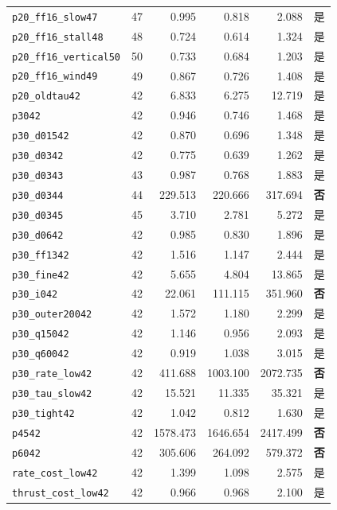 \documentclass[UTF8,a4paper,11pt,fontset=fandol]{ctexart}
\newcommand{\code}[1]{{\small\nolinkurl{#1}}}
\begin{document}
{\begin{longtable}{L{5.0cm}rrrrL{1.0cm}}
\code{p20_ff16_slow47} & 47 & 0.995 & 0.818 & 2.088 & 是\\
\code{p20_ff16_stall48} & 48 & 0.724 & 0.614 & 1.324 & 是\\
\code{p20_ff16_vertical50} & 50 & 0.733 & 0.684 & 1.203 & 是\\
\code{p20_ff16_wind49} & 49 & 0.867 & 0.726 & 1.408 & 是\\
\code{p20_oldtau42} & 42 & 6.833 & 6.275 & 12.719 & 是\\
\code{p3042} & 42 & 0.946 & 0.746 & 1.468 & 是\\
\code{p30_d01542} & 42 & 0.870 & 0.696 & 1.348 & 是\\
\code{p30_d0342} & 42 & 0.775 & 0.639 & 1.262 & 是\\
\code{p30_d0343} & 43 & 0.987 & 0.768 & 1.883 & 是\\
\code{p30_d0344} & 44 & 229.513 & 220.666 & 317.694 & \textbf{否}\\
\code{p30_d0345} & 45 & 3.710 & 2.781 & 5.272 & 是\\
\code{p30_d0642} & 42 & 0.985 & 0.830 & 1.896 & 是\\
\code{p30_ff1342} & 42 & 1.516 & 1.147 & 2.444 & 是\\
\code{p30_fine42} & 42 & 5.655 & 4.804 & 13.865 & 是\\
\code{p30_i042} & 42 & 22.061 & 111.115 & 351.960 & \textbf{否}\\
\code{p30_outer20042} & 42 & 1.572 & 1.180 & 2.299 & 是\\
\code{p30_q15042} & 42 & 1.146 & 0.956 & 2.093 & 是\\
\code{p30_q60042} & 42 & 0.919 & 1.038 & 3.015 & 是\\
\code{p30_rate_low42} & 42 & 411.688 & 1003.100 & 2072.735 & \textbf{否}\\
\code{p30_tau_slow42} & 42 & 15.521 & 11.335 & 35.321 & 是\\
\code{p30_tight42} & 42 & 1.042 & 0.812 & 1.630 & 是\\
\code{p4542} & 42 & 1578.473 & 1646.654 & 2417.499 & \textbf{否}\\
\code{p6042} & 42 & 305.606 & 264.092 & 579.372 & \textbf{否}\\
\code{rate_cost_low42} & 42 & 1.399 & 1.098 & 2.575 & 是\\
\code{thrust_cost_low42} & 42 & 0.966 & 0.968 & 2.100 & 是\\
\bottomrule\end{longtable}}
\end{document}
